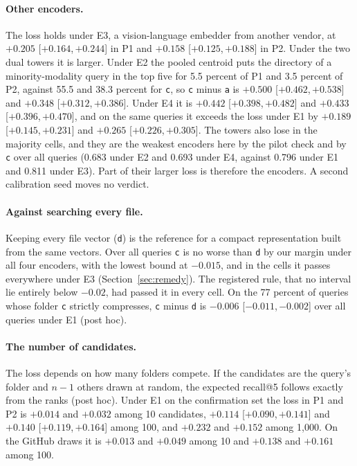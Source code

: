 \documentclass[sigconf,natbib=true,anonymous=true]{acmart}
\newcommand{\rep}[1]{\texttt{#1}}
\newcommand{\ci}[2]{[\ensuremath{#1},\,\ensuremath{#2}]}  %
\begin{document}
\paragraph{Other encoders.} The loss holds under E3, a vision-language embedder from another vendor, at $+0.205$ \ci{+0.164}{+0.244} in P1 and $+0.158$ \ci{+0.125}{+0.188} in P2. Under the two dual towers it is larger. Under E2 the pooled centroid puts the directory of a minority-modality query in the top five for 5.5 percent of P1 and 3.5 percent of P2, against 55.5 and 38.3 percent for \rep{c}, so \rep{c} minus \rep{a} is $+0.500$ \ci{+0.462}{+0.538} and $+0.348$ \ci{+0.312}{+0.386}. Under E4 it is $+0.442$ \ci{+0.398}{+0.482} and $+0.433$ \ci{+0.396}{+0.470}, and on the same queries it exceeds the loss under E1 by $+0.189$ \ci{+0.145}{+0.231} and $+0.265$ \ci{+0.226}{+0.305}. The towers also lose in the majority cells, and they are the weakest encoders here by the pilot check and by \rep{c} over all queries (0.683 under E2 and 0.693 under E4, against 0.796 under E1 and 0.811 under E3). Part of their larger loss is therefore the encoders. A second calibration seed moves no verdict.

\paragraph{Against searching every file.} Keeping every file vector (\rep{d}) is the reference for a compact representation built from the same vectors. Over all queries \rep{c} is no worse than \rep{d} by our margin under all four encoders, with the lowest bound at $-0.015$, and in the cells it passes everywhere under E3 (Section~\ref{sec:remedy}). The registered rule, that no interval lie entirely below $-0.02$, had passed it in every cell. On the 77 percent of queries whose folder \rep{c} strictly compresses, \rep{c} minus \rep{d} is $-0.006$ \ci{-0.011}{-0.002} over all queries under E1 (post hoc).

\paragraph{The number of candidates.} The loss depends on how many folders compete. If the candidates are the query's folder and $n - 1$ others drawn at random, the expected recall@5 follows exactly from the ranks (post hoc). Under E1 on the confirmation set the loss in P1 and P2 is $+0.014$ and $+0.032$ among 10 candidates, $+0.114$ \ci{+0.090}{+0.141} and $+0.140$ \ci{+0.119}{+0.164} among 100, and $+0.232$ and $+0.152$ among 1,000. On the GitHub draws it is $+0.013$ and $+0.049$ among 10 and $+0.138$ and $+0.161$ among 100.
\end{document}
